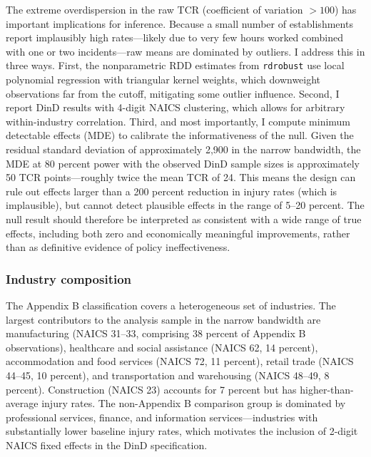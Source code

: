 \documentclass[12pt]{article}
\begin{document}
The extreme overdispersion in the raw TCR (coefficient of variation $> 100$) has important implications for inference. Because a small number of establishments report implausibly high rates---likely due to very few hours worked combined with one or two incidents---raw means are dominated by outliers. I address this in three ways. First, the nonparametric RDD estimates from \texttt{rdrobust} use local polynomial regression with triangular kernel weights, which downweight observations far from the cutoff, mitigating some outlier influence. Second, I report DinD results with 4-digit NAICS clustering, which allows for arbitrary within-industry correlation. Third, and most importantly, I compute minimum detectable effects (MDE) to calibrate the informativeness of the null. Given the residual standard deviation of approximately 2,900 in the narrow bandwidth, the MDE at 80 percent power with the observed DinD sample sizes is approximately 50 TCR points---roughly twice the mean TCR of 24. This means the design can rule out effects larger than a 200 percent reduction in injury rates (which is implausible), but cannot detect plausible effects in the range of 5--20 percent. The null result should therefore be interpreted as consistent with a wide range of true effects, including both zero and economically meaningful improvements, rather than as definitive evidence of policy ineffectiveness.

\subsubsection*{Industry composition} The Appendix B classification covers a heterogeneous set of industries. The largest contributors to the analysis sample in the narrow bandwidth are manufacturing (NAICS 31--33, comprising 38 percent of Appendix B observations), healthcare and social assistance (NAICS 62, 14 percent), accommodation and food services (NAICS 72, 11 percent), retail trade (NAICS 44--45, 10 percent), and transportation and warehousing (NAICS 48--49, 8 percent). Construction (NAICS 23) accounts for 7 percent but has higher-than-average injury rates. The non-Appendix B comparison group is dominated by professional services, finance, and information services---industries with substantially lower baseline injury rates, which motivates the inclusion of 2-digit NAICS fixed effects in the DinD specification.
\end{document}
